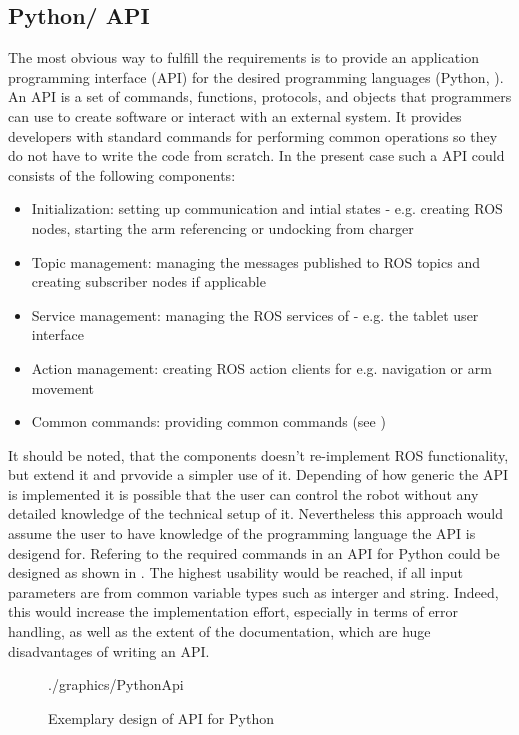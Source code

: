 \subsection{Python/\Cpp{} API}
\label{sub:PyApi}
The most obvious way to fulfill the requirements is to provide an application programming interface (API) for the desired programming languages (Python, \Cpp{}). An API is a set of commands, functions, protocols, and objects that programmers can use to create software or interact with an external system. It provides developers with standard commands for performing common operations so they do not have to write the code from scratch. In the present case such a API could consists of the following components:

\begin{itemize}
	\item Initialization: setting up communication and intial states - e.g. creating ROS nodes, starting the arm referencing or undocking from charger
	\item Topic management: managing the messages published to ROS topics and creating subscriber nodes if applicable
	\item Service management: managing the ROS services of \hobbit{} - e.g. the tablet user interface
	\item Action management: creating ROS action clients for e.g. navigation or arm movement
	\item Common commands: providing common commands (see )
\end{itemize}

It should be noted, that the components doesn't re-implement ROS functionality, but extend it and prvovide a simpler use of it. Depending of how generic the API is implemented it is possible that the user can control the robot without any detailed knowledge of the technical setup of it. Nevertheless this approach would assume the user to have knowledge of the programming language the API is desigend for. Refering to the required commands in  an API for Python could be designed as shown in . The highest usability would be reached, if all input parameters are from common variable types such as interger and string. Indeed, this would increase the implementation effort, especially in terms of error handling, as well as the extent of the documentation,  which are huge disadvantages of writing an API. \\

\begin{figure}[htbp]
	\centering
	\begin{overpic}[width=0.8\linewidth]{./graphics/PythonApi}
	\end{overpic}
	\caption{Exemplary design of API for Python}%
	\label{fig:PythonApi}%
\end{figure}

